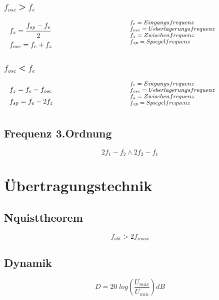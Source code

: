 \documentclass[12pt,a5paper,ngerman,titlepage]{article}
\begin{document}
\subsubsection{$f_{osc} \;$>$\; f_{e}$}
\[
\begin{minipage}{.5\linewidth}
	
  $f_{z} = \cfrac{f_{sp}-f_{e}}{2}$ \\[5pt]
  $f_{osc} = f_{e} + f_{z}$
\end{minipage}%
\begin{minipage}{.5\linewidth}
  \fontsize{8pt}{9pt}\selectfont
  $f_{e} = Eingangsfrequenz$ \\
  $f_{osc} = Ueberlagerungsfrequenz$ \\
  $f_{z} = Zwischenfrequenz$ \\
  $f_{sp} = Spiegelfrequenz$ \\
\end{minipage}
\]
\subsubsection{$f_{osc} \;$<$\; f_{e}$}
\[
\begin{minipage}{.5\linewidth}
	
  $f_{z} =f_{e}- f_{osc}$ \\[5pt]
  $f_{sp} = f_{e} - 2 f_{z}$
\end{minipage}%
\begin{minipage}{.5\linewidth}
  \fontsize{8pt}{9pt}\selectfont
  $f_{e} = Eingangsfrequenz$ \\
  $f_{osc} = Ueberlagerungsfrequenz$ \\
  $f_{z} = Zwischenfrequenz$ \\
  $f_{sp} = Spiegelfrequenz$ \\
\end{minipage}
\]
\subsection{Frequenz 3.Ordnung}
$$ 2f_{1}-f_{2} \wedge 2f_{2}-f_{1}$$
\newpage
\section{Übertragungstechnik}
\subsection{Nquisttheorem}
$$f_{abt} > 2f_{i max}$$

\subsection{Dynamik}
$$D=20 \; log \left(\frac{U_{max}}{U_{min}}\right) dB$$
\end{document}
